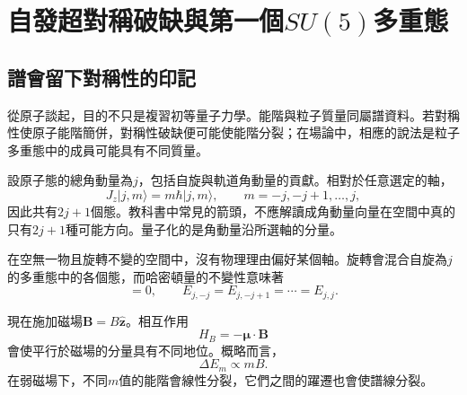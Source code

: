 \chapter{自發超對稱破缺與第一個\texorpdfstring{\(SU(5)\)}{SU(5)}多重態}


\section{譜會留下對稱性的印記}

從原子談起，目的不只是複習初等量子力學。能階與粒子質量同屬譜資料。若對稱性使原子能階簡併，對稱性破缺便可能使能階分裂；在場論中，相應的說法是粒子多重態中的成員可能具有不同質量。

設原子態的總角動量為\(j\)，包括自旋與軌道角動量的貢獻。相對於任意選定的軸，
\begin{equation}
J_z|j,m\rangle=m\hbar|j,m\rangle,
\qquad
m=-j,-j+1,\ldots,j,
\end{equation}
因此共有\(2j+1\)個態。教科書中常見的箭頭，不應解讀成角動量向量在空間中真的只有\(2j+1\)種可能方向。量子化的是角動量沿所選軸的分量。

在空無一物且旋轉不變的空間中，沒有物理理由偏好某個軸。旋轉會混合自旋為\(j\)的多重態中的各個態，而哈密頓量的不變性意味著
\begin{equation}
[H,\mathbf J]=0,
\qquad
E_{j,-j}=E_{j,-j+1}=\cdots=E_{j,j}.
\label{eq:l9-degeneracy}
\end{equation}

\begin{classroomqa}
\end{classroomqa}

現在施加磁場\(\mathbf B=B\hat{\mathbf z}\)。相互作用
\begin{equation}
H_B=-\boldsymbol{\mu}\cdot\mathbf B
\end{equation}
會使平行於磁場的分量具有不同地位。概略而言，
\begin{equation}
\Delta E_m\propto mB.
\label{eq:l9-zeeman}
\end{equation}
在弱磁場下，不同\(m\)值的能階會線性分裂，它們之間的躍遷也會使譜線分裂。

